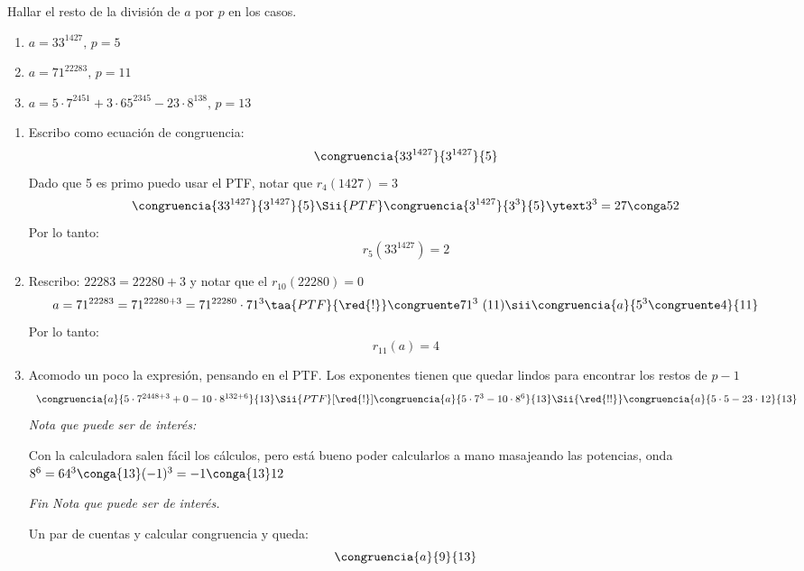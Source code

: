 \begin{enunciado}{\ejercicio}
  Hallar el resto de la división de $a$ por $p$ en los casos.
  \begin{enumerate}[label=\alph*)]
    \item $a = 33^{1427}, \, p =5$
    \item $a = 71^{22283},\, p=11$
    \item $a = 5 \cdot 7^{2451} + 3 \cdot 65^{2345} - 23 \cdot 8^{138}, \, p = 13$
  \end{enumerate}
\end{enunciado}

\begin{enumerate}[label=\alph*)]
  \item Escribo como ecuación de congruencia:
        $$
          \congruencia{33^{1427}}{3^{1427}}{5}
        $$
        Dado que 5 es primo puedo usar el PTF, notar que $r_4(1427) = 3 $
        $$
          \congruencia{33^{1427}}{3^{1427}}{5}
          \Sii{PTF}
          \congruencia{3^{1427}}{3^3}{5} \ytext 3^3 = 27 \conga5 2
        $$
                Por lo tanto:
                $$
                r_5(33^{1427}) = 2
                $$
  \item
        Rescribo: $22283 = 22280 + 3$ y notar que el $r_{10}(22280) = 0$
        $$
          a = 71^{22283} =
          71^{22280 + 3} =
          71^{22280} \cdot 71^3
          \taa{PTF}{\red{!}}\congruente 71^3 \ (11) \sii \congruencia{a}{5^3 \congruente 4}{11}
        $$
        Por lo tanto:
        $$
          r_{11}(a) = 4
        $$

  \item
        Acomodo un poco la expresión, pensando en el PTF. Los exponentes tienen que quedar lindos para encontrar los restos de $p-1$
        $$
          \begin{array}{l}
            \congruencia{a}{5 \cdot 7^{2448 + 3} + 0 - 10 \cdot 8^{132 + 6}}{13}
            \Sii{PTF}[\red{!}]
            \congruencia{a}{5 \cdot 7^3 - 10 \cdot 8^6}{13}
            \Sii{\red{!!}}
            \congruencia{a}{5 \cdot 5 - 23 \cdot 12}{13}
          \end{array}
        $$
        \textit{ Nota que puede ser de interés:}\par
        Con la calculadora salen fácil los cálculos, pero está bueno poder calcularlos a mano masajeando las potencias, onda
        $8^6 = 64^3 \conga{13} (-1)^3 = -1 \conga{13} 12$\par
        \textit{ Fin Nota que puede ser de interés.}

        Un par de cuentas y calcular congruencia y queda:
        $$
          \congruencia{a}{9}{13}
        $$
\end{enumerate}

\begin{aportes}
  \item {}
\end{aportes}
